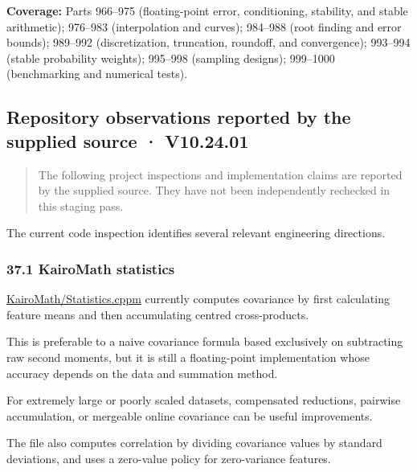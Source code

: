 \textbf{Coverage:} Parts 966--975 (floating-point error, conditioning, stability, and stable arithmetic); 976--983 (interpolation and curves); 984--988 (root finding and error bounds); 989--992 (discretization, truncation, roundoff, and convergence); 993--994 (stable probability weights); 995--998 (sampling designs); 999--1000 (benchmarking and numerical tests).

\subsection{Repository observations reported by the supplied source · V10.24.01}\label{02-foundations-ii-ch039-repository-observations-reported-by-the-supplied-source-v10.24.01}

\hypertarget{02-foundations-ii-ch039-repository-observations-reported-by-the-supplied-source-v10.24.01}{}

\begin{quote}
The following project inspections and implementation claims are reported by the supplied source. They have not been independently rechecked in this staging pass.
\end{quote}

The current code inspection identifies several relevant engineering directions.

\subsubsection{37.1 KairoMath statistics}\label{02-foundations-ii-ch039-kairomath-statistics-1}

\hypertarget{02-foundations-ii-ch039-kairomath-statistics-1}{}

\href{https://github.com/swayam8624/KairoMath/blob/master/Statistics.cppm?utm_source=chatgpt.com}{KairoMath/Statistics.cppm} currently computes covariance by first calculating feature means and then accumulating centred cross-products.

This is preferable to a naive covariance formula based exclusively on subtracting raw second moments, but it is still a floating-point implementation whose accuracy depends on the data and summation method.

For extremely large or poorly scaled datasets, compensated reductions, pairwise accumulation, or mergeable online covariance can be useful improvements.

The file also computes correlation by dividing covariance values by standard deviations, and uses a zero-value policy for zero-variance features.

